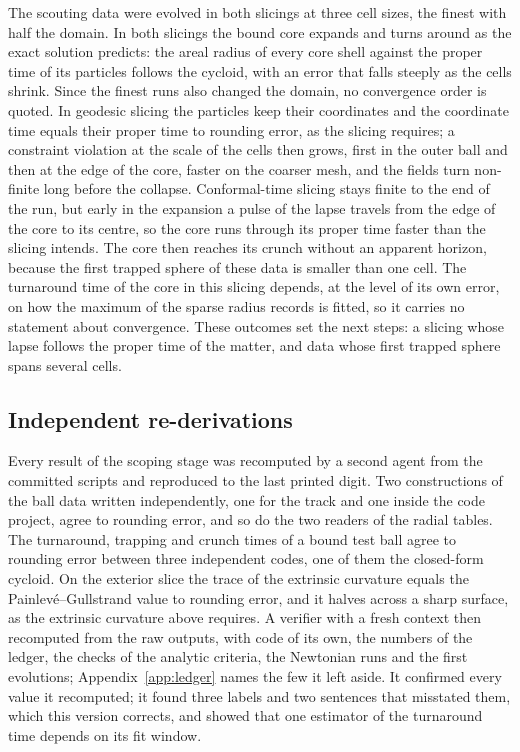 \documentclass[aps,prd,twocolumn,10pt,superscriptaddress,nofootinbib,longbibliography,floatfix]{revtex4-2}
\begin{document}
The scouting data were evolved in both slicings at three cell sizes, the finest with half the domain. In both slicings the bound core expands and turns around as the exact solution predicts: the areal radius of every core shell against the proper time of its particles follows the cycloid, with an error that falls steeply as the cells shrink. Since the finest runs also changed the domain, no convergence order is quoted. In geodesic slicing the particles keep their coordinates and the coordinate time equals their proper time to rounding error, as the slicing requires; a constraint violation at the scale of the cells then grows, first in the outer ball and then at the edge of the core, faster on the coarser mesh, and the fields turn non-finite long before the collapse. Conformal-time slicing stays finite to the end of the run, but early in the expansion a pulse of the lapse travels from the edge of the core to its centre, so the core runs through its proper time faster than the slicing intends. The core then reaches its crunch without an apparent horizon, because the first trapped sphere of these data is smaller than one cell. The turnaround time of the core in this slicing depends, at the level of its own error, on how the maximum of the sparse radius records is fitted, so it carries no statement about convergence. These outcomes set the next steps: a slicing whose lapse follows the proper time of the matter, and data whose first trapped sphere spans several cells.

\subsection{Independent re-derivations}\label{sec:rederivations}

Every result of the scoping stage was recomputed by a second agent from the committed scripts and reproduced to the last printed digit. Two constructions of the ball data written independently, one for the track and one inside the code project, agree to rounding error, and so do the two readers of the radial tables. The turnaround, trapping and crunch times of a bound test ball agree to rounding error between three independent codes, one of them the closed-form cycloid. On the exterior slice the trace of the extrinsic curvature equals the Painlev\'e--Gullstrand value to rounding error, and it halves across a sharp surface, as the extrinsic curvature above requires. A verifier with a fresh context then recomputed from the raw outputs, with code of its own, the numbers of the ledger, the checks of the analytic criteria, the Newtonian runs and the first evolutions; Appendix~\ref{app:ledger} names the few it left aside. It confirmed every value it recomputed; it found three labels and two sentences that misstated them, which this version corrects, and showed that one estimator of the turnaround time depends on its fit window.
\end{document}
